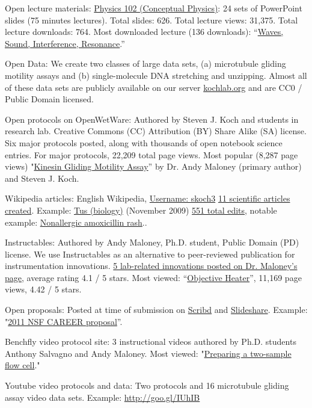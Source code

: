 \documentclass[11pt]{article}
\begin{document}
\ind Open lecture materials: \href{http://goo.gl/2L7kC}{Physics 102 (Conceptual Physics)}: 24 sets of PowerPoint slides (75 minutes lectures).  Total slides: 626. Total lecture views: 31,375. Total lecture downloads: 764. Most downloaded lecture (136 downloads): “\href{http://goo.gl/FCsfM}{Waves, Sound, Interference, Resonance}.” 

\ind Open Data: We create two classes of large data sets, (a) microtubule gliding motility assays and (b) single-molecule DNA stretching and unzipping.  Almost all of these data sets are publicly available on our server \href{http://goo.gl/5MlVY}{kochlab.org} and are CC0 / Public Domain licensed. 

\ind Open protocols on OpenWetWare: Authored by Steven J. Koch and students in research lab. Creative Commons (CC) Attribution (BY) Share Alike (SA) license. Six major protocols posted, along with thousands of open notebook science entries.  For major protocols, 22,209 total page views.  Most popular (8,287 page views) "\href{http://goo.gl/nGmJb}{Kinesin Gliding Motility Assay}” by Dr. Andy Maloney (primary author) and Steven J. Koch.  

\ind Wikipedia articles: English Wikipedia, \href{http://goo.gl/Uz9MS}{Username: skoch3} \href{http://goo.gl/MZROA}{11 scientific articles created}. Example: \href{http://goo.gl/Tgr5u}{Tus (biology)} (November 2009) \href{http://goo.gl/oroi1}{551 total edits}, notable example: \href{http://goo.gl/qYkHt}{Nonallergic amoxicillin rash}.. 

\ind Instructables: Authored by Andy Maloney, Ph.D. student, Public Domain (PD) license. We use Instructables as an alternative to peer-reviewed publication for instrumentation innovations.  \href{http://goo.gl/sVvZs}{5 lab-related innovations posted on Dr. Maloney’s page}, average rating 4.1 / 5 stars.  Most viewed: “\href{http://goo.gl/oOgjZ}{Objective Heater}”, 11,169 page views, 4.42 / 5 stars.

\ind Open proposals: Posted at time of submission on \href{http://goo.gl/Xhv1C}{Scribd} and \href{http://goo.gl/zeLJW}{Slideshare}. Example: "\href{http://goo.gl/nQ20k}{2011 NSF CAREER proposal}”. 

\ind Benchfly video protocol site: 3 instructional videos authored by Ph.D. students Anthony Salvagno and Andy Maloney.  Most viewed: "\href{http://goo.gl/tHkob}{Preparing a two-sample flow cell}."

\ind Youtube video protocols and data: Two protocols and 16 microtubule gliding assay video data sets.  Example: \href{http://goo.gl/IUhIB}{http://goo.gl/IUhIB}  
\end{document}
